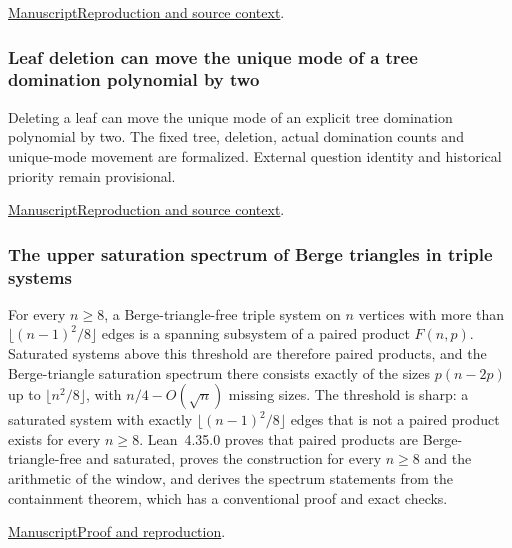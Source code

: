 \documentclass[11pt,a4paper]{article}
\begin{document}
\href{https://github.com/dvgyl/math-and-theory/blob/main/papers/mathematics/graph-roots/manuscript.pdf}{Manuscript}\quad\href{https://github.com/dvgyl/math-and-theory/blob/main/papers/mathematics/graph-roots/README.md}{Reproduction and source context}.

\subsubsection{Leaf deletion can move the unique mode of a tree domination polynomial by two}

Deleting a leaf can move the unique mode of an explicit tree domination polynomial by two. The fixed tree, deletion, actual domination counts and unique-mode movement are formalized. External question identity and historical priority remain provisional.

\href{https://github.com/dvgyl/math-and-theory/blob/main/papers/mathematics/leaf-deletion/manuscript/manuscript.pdf}{Manuscript}\quad\href{https://github.com/dvgyl/math-and-theory/blob/main/papers/mathematics/leaf-deletion/README.md}{Reproduction and source context}.

\subsubsection{The upper saturation spectrum of Berge triangles in triple systems}

For every $n\ge8$, a Berge-triangle-free triple system on $n$ vertices with more than $\lfloor (n-1)^2/8\rfloor$ edges is a spanning subsystem of a paired product $F(n,p)$. Saturated systems above this threshold are therefore paired products, and the Berge-triangle saturation spectrum there consists exactly of the sizes $p(n-2p)$ up to $\lfloor n^2/8\rfloor$, with $n/4-O(\sqrt n)$ missing sizes. The threshold is sharp: a saturated system with exactly $\lfloor (n-1)^2/8\rfloor$ edges that is not a paired product exists for every $n\ge8$. Lean~4.35.0 proves that paired products are Berge-triangle-free and saturated, proves the construction for every $n\ge8$ and the arithmetic of the window, and derives the spectrum statements from the containment theorem, which has a conventional proof and exact checks.

\noindent\href{https://github.com/dvgyl/math-and-theory/blob/main/papers/mathematics/berge-triangle-spectrum/manuscript.pdf}{Manuscript}\quad\href{https://github.com/dvgyl/math-and-theory/blob/main/papers/mathematics/berge-triangle-spectrum/README.md}{Proof and reproduction}.
\end{document}
